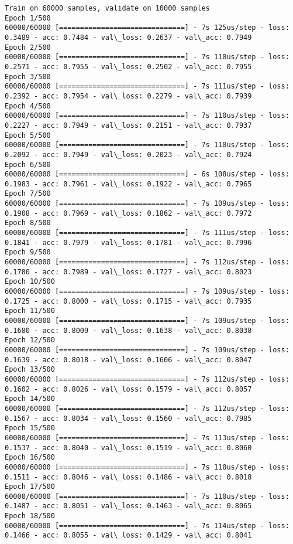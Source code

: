 \documentclass[11pt]{article}
\begin{document}
    \begin{Verbatim}[commandchars=\\\{\}]
Train on 60000 samples, validate on 10000 samples
Epoch 1/500
60000/60000 [==============================] - 7s 125us/step - loss: 0.3489 - acc: 0.7484 - val\_loss: 0.2637 - val\_acc: 0.7949
Epoch 2/500
60000/60000 [==============================] - 7s 110us/step - loss: 0.2571 - acc: 0.7955 - val\_loss: 0.2502 - val\_acc: 0.7955
Epoch 3/500
60000/60000 [==============================] - 7s 111us/step - loss: 0.2392 - acc: 0.7954 - val\_loss: 0.2279 - val\_acc: 0.7939
Epoch 4/500
60000/60000 [==============================] - 7s 110us/step - loss: 0.2227 - acc: 0.7949 - val\_loss: 0.2151 - val\_acc: 0.7937
Epoch 5/500
60000/60000 [==============================] - 7s 110us/step - loss: 0.2092 - acc: 0.7949 - val\_loss: 0.2023 - val\_acc: 0.7924
Epoch 6/500
60000/60000 [==============================] - 6s 108us/step - loss: 0.1983 - acc: 0.7961 - val\_loss: 0.1922 - val\_acc: 0.7965
Epoch 7/500
60000/60000 [==============================] - 7s 109us/step - loss: 0.1908 - acc: 0.7969 - val\_loss: 0.1862 - val\_acc: 0.7972
Epoch 8/500
60000/60000 [==============================] - 7s 111us/step - loss: 0.1841 - acc: 0.7979 - val\_loss: 0.1781 - val\_acc: 0.7996
Epoch 9/500
60000/60000 [==============================] - 7s 112us/step - loss: 0.1780 - acc: 0.7989 - val\_loss: 0.1727 - val\_acc: 0.8023
Epoch 10/500
60000/60000 [==============================] - 7s 109us/step - loss: 0.1725 - acc: 0.8000 - val\_loss: 0.1715 - val\_acc: 0.7935
Epoch 11/500
60000/60000 [==============================] - 7s 109us/step - loss: 0.1680 - acc: 0.8009 - val\_loss: 0.1638 - val\_acc: 0.8038
Epoch 12/500
60000/60000 [==============================] - 7s 109us/step - loss: 0.1639 - acc: 0.8018 - val\_loss: 0.1606 - val\_acc: 0.8047
Epoch 13/500
60000/60000 [==============================] - 7s 112us/step - loss: 0.1602 - acc: 0.8026 - val\_loss: 0.1579 - val\_acc: 0.8057
Epoch 14/500
60000/60000 [==============================] - 7s 112us/step - loss: 0.1567 - acc: 0.8034 - val\_loss: 0.1560 - val\_acc: 0.7985
Epoch 15/500
60000/60000 [==============================] - 7s 113us/step - loss: 0.1537 - acc: 0.8040 - val\_loss: 0.1519 - val\_acc: 0.8060
Epoch 16/500
60000/60000 [==============================] - 7s 110us/step - loss: 0.1511 - acc: 0.8046 - val\_loss: 0.1486 - val\_acc: 0.8018
Epoch 17/500
60000/60000 [==============================] - 7s 110us/step - loss: 0.1487 - acc: 0.8051 - val\_loss: 0.1463 - val\_acc: 0.8065
Epoch 18/500
60000/60000 [==============================] - 7s 114us/step - loss: 0.1466 - acc: 0.8055 - val\_loss: 0.1429 - val\_acc: 0.8041

\end{Verbatim}
\end{document}
